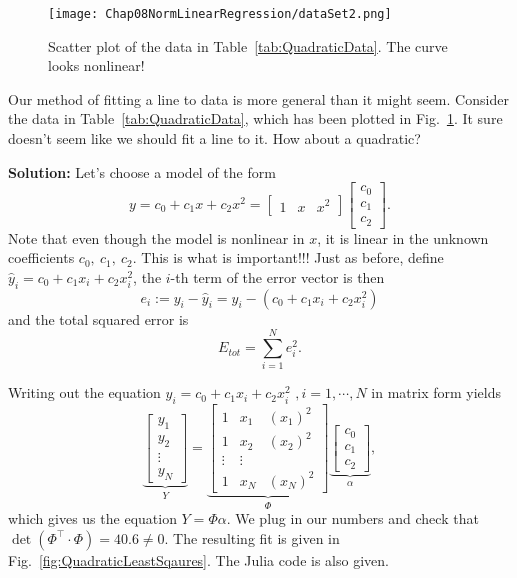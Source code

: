 \begin{figure}[!hbt]
        \centerline{\texttt{[image: Chap08NormLinearRegression/dataSet2.png]}}
        \caption{Scatter plot of the data in Table~\ref{tab:QuadraticData}. The curve looks nonlinear!}
        \label{fig:PlotQuadraticData}
\end{figure}

\begin{example}
\label{ex:FitQuadraticData}
Our method of fitting a line to data is more general than it might seem. Consider the data in Table~\ref{tab:QuadraticData}, which has been plotted in Fig.~\ref{fig:PlotQuadraticData}. It sure doesn't seem like we should fit a line to it. How about a quadratic? 
\end{example}

\textbf{Solution:} Let's choose a model of the form 
$$y=c_0 + c_1 x + c_2 x^2 = \begin{bmatrix} 1 & x & x^2 \end{bmatrix} \begin{bmatrix} c_0 \\ c_1 \\ c_2 \end{bmatrix}.$$ 
Note that even though the model is nonlinear in $x$, it is linear in the unknown coefficients $c_0, ~c_1,~ c_2$. This is what is important!!! Just as before, define $\hat y_i = c_0 + c_1 x_i + c_2 x_i^2$, the $i$-th term of the error vector is then 
$$e_i := y_i - \hat y_i = y_i- (c_0 + c_1 x_i + c_2 x_i^2) $$
and the total squared error is $$E_{tot} = \sum_{i=1}^{N} e_i^2.$$


Writing out the equation $y_i = c_0 + c_1 x_i + c_2 x_i^2$ $,i=1,\cdots,N$ in matrix form yields
$$
\underbrace{\left[ \begin{array}{c} y_1 \\ y_2 \\ \vdots \\ y_N \end{array} \right]}_{Y} =
 \underbrace{\left[ \begin{array}{ccc} 1 & x_1 & (x_1)^2 \\ 1 & x_2 & (x_2)^2 \\ \vdots & \vdots \\ 1 & x_N & (x_N)^2 \end{array} \right]}_{\Phi}
 \underbrace{\left[ \begin{array}{c} c_0 \\ c_1 \\ c_2 \end{array} \right] }_{\alpha},
$$
which gives us the equation $Y = \Phi \alpha$. We plug in our numbers and check that $\det(\Phi^\top \cdot \Phi) = 40.6 \neq 0.$ The resulting fit is given in Fig.~\ref{fig:QuadraticLeastSqaures}. The Julia code is also given.

